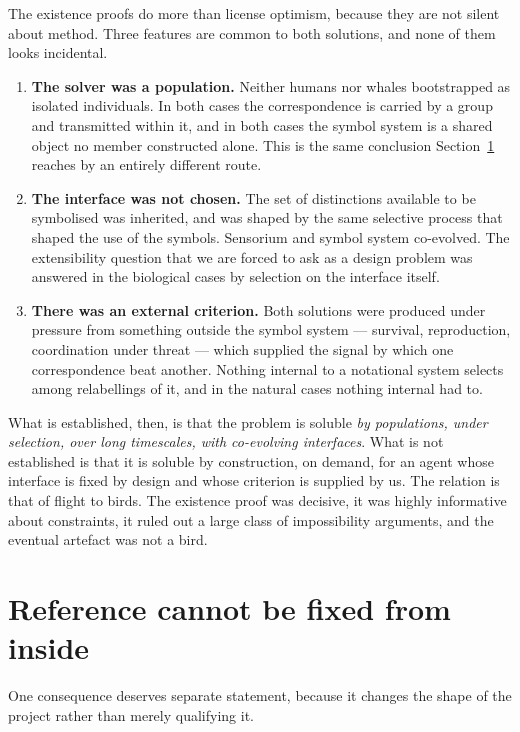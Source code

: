 \noindent
The existence proofs do more than license optimism, because they
are not silent about method.
Three features are common to both solutions, and none of them looks
incidental.

\begin{enumerate}[label=(\roman*),leftmargin=2.2em]
\item \textbf{The solver was a population.}
Neither humans nor whales bootstrapped as isolated individuals.
In both cases the correspondence is carried by a group and
transmitted within it, and in both cases the symbol system is a
shared object no member constructed alone.
This is the same conclusion Section~\ref{sec:social} reaches by an
entirely different route.
\item \textbf{The interface was not chosen.}
The set of distinctions available to be symbolised was inherited,
and was shaped by the same selective process that shaped the use of
the symbols.
Sensorium and symbol system co-evolved.
The extensibility question that we are forced to ask as a design
problem was answered in the biological cases by selection on the
interface itself.
\item \textbf{There was an external criterion.}
Both solutions were produced under pressure from something outside
the symbol system --- survival, reproduction, coordination under
threat --- which supplied the signal by which one correspondence
beat another.
Nothing internal to a notational system selects among relabellings
of it, and in the natural cases nothing internal had to.
\end{enumerate}

\noindent
What is established, then, is that the problem is soluble \emph{by
populations, under selection, over long timescales, with
co-evolving interfaces}.
What is not established is that it is soluble by construction, on
demand, for an agent whose interface is fixed by design and whose
criterion is supplied by us.
The relation is that of flight to birds.
The existence proof was decisive, it was highly informative about
constraints, it ruled out a large class of impossibility arguments,
and the eventual artefact was not a bird.

\section{Reference cannot be fixed from inside}
\label{sec:social}

One consequence deserves separate statement, because it changes the
shape of the project rather than merely qualifying it.

